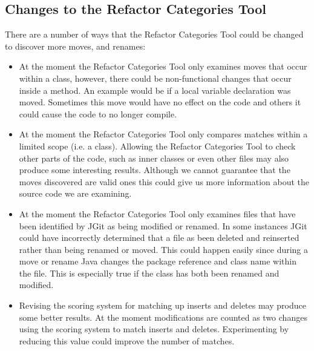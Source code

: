 \subsection{Changes to the Refactor Categories Tool}

There are a number of ways that the Refactor Categories Tool could be changed to discover more moves, and renames:

\begin{itemize}

  \item At the moment the Refactor Categories Tool only examines moves that occur within a class, however, there could be non-functional changes that occur inside a method. 
An example would be if a local variable declaration was moved.
Sometimes this move would have no effect on the code and others it could cause the code to no longer compile.
  
  \item At the moment the Refactor Categories Tool only compares matches within a limited scope (i.e. a class).  
Allowing the Refactor Categories Tool to check other parts of the code, such as inner classes or even other files may also produce some interesting results.
Although we cannot guarantee that the moves discovered are valid ones this could give us more information about the source code we are examining.

  \item At the moment the Refactor Categories Tool only examines files that have been identified by JGit as being modified or renamed.
In some instances JGit could have incorrectly determined that a file as been deleted and reinserted rather than being renamed or moved.
This could happen easily since during a move or rename Java changes the package reference and class name within the file.
This is especially true if the class has both been renamed and modified.

  \item Revising the scoring system for matching up inserts and deletes may produce some better results.
At the moment modifications are counted as two changes using the scoring system to match inserts and deletes.
Experimenting by reducing this value could improve the number of matches.

\end{itemize}





